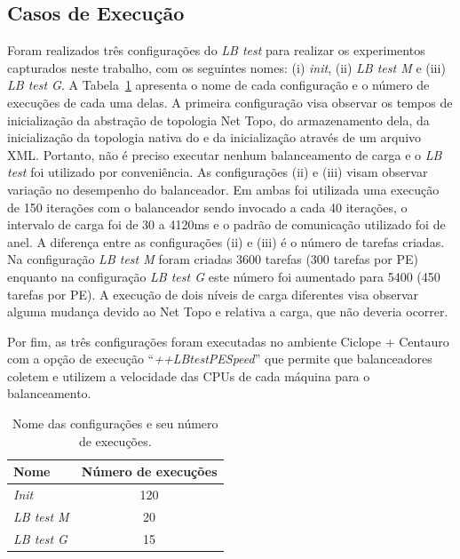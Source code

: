 \subsection{Casos de Execução}
\label{subsec:casos_exec}

Foram realizados três configurações do \textit{LB test} para realizar os experimentos capturados neste trabalho, com os seguintes nomes: (i) \textit{init}, (ii) \textit{LB test M} e (iii) \textit{LB test G}.
A Tabela~\ref{tab:execution_count} apresenta o nome de cada configuração e o número de execuções de cada uma delas.
A primeira configuração visa observar os tempos de inicialização da abstração de topologia Net Topo, do armazenamento dela, da inicialização da topologia nativa do \charm e da inicialização através de um arquivo XML. 
Portanto, não é preciso executar nenhum balanceamento de carga e o \textit{LB test} foi utilizado por conveniência.
As configurações (ii) e (iii) visam observar variação no desempenho do balanceador.
Em ambas foi utilizada uma execução de 150 iterações com o balanceador sendo invocado a cada 40 iterações, o intervalo de carga foi de 30 a 4120ms e o padrão de comunicação utilizado foi de anel.
A diferença entre as configurações (ii) e (iii) é o número de tarefas criadas.
Na configuração \textit{LB test M} foram criadas 3600 tarefas (300 tarefas por PE) enquanto na configuração \textit{LB test G} este número foi aumentado para 5400 (450 tarefas por PE).
A execução de dois níveis de carga diferentes visa observar alguma mudança devido ao Net Topo e relativa a carga, que não deveria ocorrer.

Por fim, as três configurações foram executadas no ambiente Ciclope + Centauro com a opção de execução ``\textit{++LBtestPESpeed}'' que permite que balanceadores coletem e utilizem a velocidade das CPUs de cada máquina para o balanceamento.

\setlength{\tabcolsep}{0.5em}
\begin{table}[!ht]
    \centering
    \begin{tabular}{l c}
        \toprule
        \textbf{Nome} &    \textbf{Número de execuções} \\ \midrule
        \textit{Init} & 120   \\ %
        \textit{LB test M} & 20   \\ %
        \textit{LB test G} & 15 \\ \bottomrule
    \end{tabular}
    \caption[Configurações de execução]{Nome das configurações e seu número de execuções.}
    \label{tab:execution_count}
\end{table}

